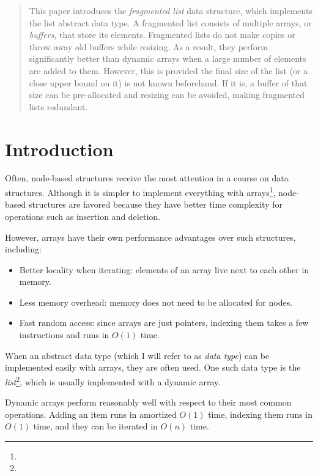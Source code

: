 \documentclass{article}
\begin{document}
	\begin{abstract}
		This paper introduces the \textit{fragmented list} data structure, which implements the list abstract data type. A fragmented list consists of multiple arrays, or \textit{buffers}, that store its elements. Fragmented lists do not make copies or throw away old buffers while resizing. As a result, they perform significantly better than dynamic arrays when a large number of elements are added to them. However, this is provided the final size of the list (or a close upper bound on it) is not known beforehand. If it is, a buffer of that size can be pre-allocated and resizing can be avoided, making fragmented lists redundant.
	\end{abstract}

	\section{Introduction}
	\label{Introduction}
	
	Often, node-based structures receive the most attention in a course on data structures. Although it is simpler to implement everything with arrays\footnote{}, node-based structures are favored because they have better time complexity for operations such as insertion and deletion.\par

	However, arrays have their own performance advantages over such structures, including:\par
	
	\begin{itemize}
		\item Better locality when iterating: elements of an array live next to each other in memory.
		\item Less memory overhead: memory does not need to be allocated for nodes.
		\item Fast random access: since arrays are just pointers, indexing them takes a few instructions and runs in $O(1)$ time.
	\end{itemize}

	When an abstract data type (which I will refer to as \textit{data type}) can be implemented easily with arrays, they are often used. One such data type is the \textit{list}\footnote{}, which is usually implemented with a dynamic array.\par

	Dynamic arrays perform reasonably well with respect to their most common operations. Adding an item runs in amortized $O(1)$ time, indexing them runs in $O(1)$ time, and they can be iterated in $O(n)$ time.\par
	
\end{document}

